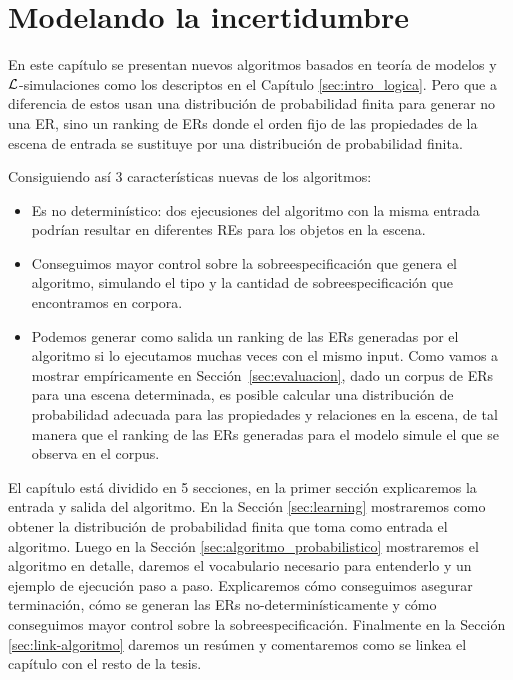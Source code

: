 \chapter{Modelando la incertidumbre}
\label{sec:algoritmo}

En este cap\'itulo se presentan nuevos algoritmos basados en teor\'ia de modelos y $\mathcal{L}$-simulaciones como los descriptos en el Cap\'itulo \ref{sec:intro_logica}. Pero que a diferencia de estos usan una distribuci\'on de probabilidad finita para generar no una ER, sino un ranking de ERs donde el orden fijo de las propiedades de
la escena de entrada se sustituye por una distribuci\'on de probabilidad finita. 

Consiguiendo as\'i 3 caracter\'isticas nuevas de los algoritmos:
\begin{itemize}
 \item Es no determin\'istico: dos ejecusiones del algoritmo con la
misma entrada podr\'{i}an resultar en diferentes REs para los objetos en la escena.

 \item Conseguimos mayor control sobre la sobreespecificaci\'on que genera el algoritmo, simulando el tipo y la cantidad de sobreespecificaci\'on que encontramos en  corpora.

 \item Podemos generar como salida un ranking de las ERs generadas por el algoritmo si lo ejecutamos muchas veces con
el mismo input. 
Como vamos a mostrar emp\'{i}ricamente en
Secci\'on~\ref{sec:evaluacion}, dado un corpus de ERs para una escena determinada,
es posible calcular una distribuci\'on de probabilidad adecuada para las propiedades y relaciones en la escena, de tal manera que el ranking de
las ERs generadas para el modelo simule el que se observa en el corpus.
\end{itemize}

El cap\'itulo est\'a dividido en 5 secciones, en la primer secci\'on explicaremos la entrada y salida del algoritmo. En la Secci\'on \ref{sec:learning} mostraremos como obtener la distribuci\'on de probabilidad finita que toma como entrada el algoritmo. Luego en la Secci\'on \ref{sec:algoritmo_probabilistico} mostraremos el algoritmo en detalle, daremos el vocabulario necesario para entenderlo y un ejemplo de ejecuci\'on paso a paso. Explicaremos c\'omo conseguimos asegurar terminaci\'on, c\'omo se generan las ERs no-determin\'isticamente y c\'omo conseguimos mayor control sobre la sobreespecificaci\'on. Finalmente en la Secci\'on \ref{sec:link-algoritmo} daremos un res\'umen y comentaremos como se linkea el cap\'itulo con el resto de la tesis.

